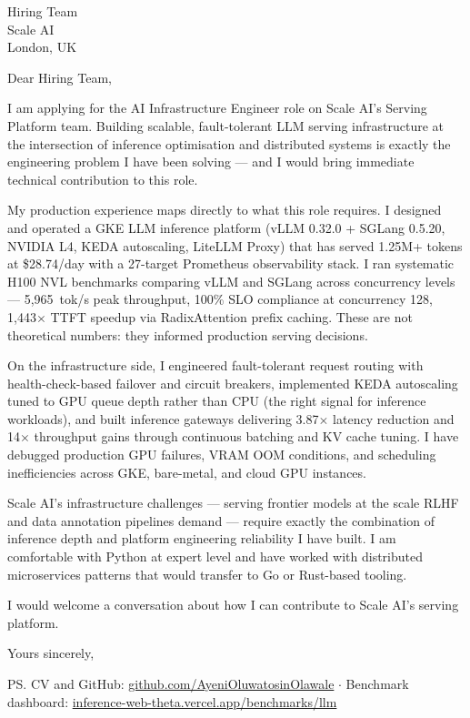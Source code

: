 \documentclass[12pt,a4paper]{letter}
\date{10 November 2026}
\begin{document}
\begin{letter}{Hiring Team \\ Scale AI \\ London, UK}

\opening{Dear Hiring Team,}

I am applying for the AI Infrastructure Engineer role on Scale AI's Serving Platform team. Building scalable, fault-tolerant LLM serving infrastructure at the intersection of inference optimisation and distributed systems is exactly the engineering problem I have been solving — and I would bring immediate technical contribution to this role.

My production experience maps directly to what this role requires. I designed and operated a GKE LLM inference platform (vLLM 0.32.0 + SGLang 0.5.20, NVIDIA L4, KEDA autoscaling, LiteLLM Proxy) that has served 1.25M+ tokens at \$28.74/day with a 27-target Prometheus observability stack. I ran systematic H100 NVL benchmarks comparing vLLM and SGLang across concurrency levels — 5,965~tok/s peak throughput, 100\% SLO compliance at concurrency 128, 1,443$\times$ TTFT speedup via RadixAttention prefix caching. These are not theoretical numbers: they informed production serving decisions.

On the infrastructure side, I engineered fault-tolerant request routing with health-check-based failover and circuit breakers, implemented KEDA autoscaling tuned to GPU queue depth rather than CPU (the right signal for inference workloads), and built inference gateways delivering 3.87$\times$ latency reduction and 14$\times$ throughput gains through continuous batching and KV cache tuning. I have debugged production GPU failures, VRAM OOM conditions, and scheduling inefficiencies across GKE, bare-metal, and cloud GPU instances.

Scale AI's infrastructure challenges — serving frontier models at the scale RLHF and data annotation pipelines demand — require exactly the combination of inference depth and platform engineering reliability I have built. I am comfortable with Python at expert level and have worked with distributed microservices patterns that would transfer to Go or Rust-based tooling.

I would welcome a conversation about how I can contribute to Scale AI's serving platform.

\closing{Yours sincerely,}

\ps{CV and GitHub: \href{https://github.com/AyeniOluwatosinOlawale}{github.com/AyeniOluwatosinOlawale} $\cdot$ Benchmark dashboard: \href{https://inference-web-theta.vercel.app/benchmarks/llm}{inference-web-theta.vercel.app/benchmarks/llm}}

\end{letter}
\end{document}
